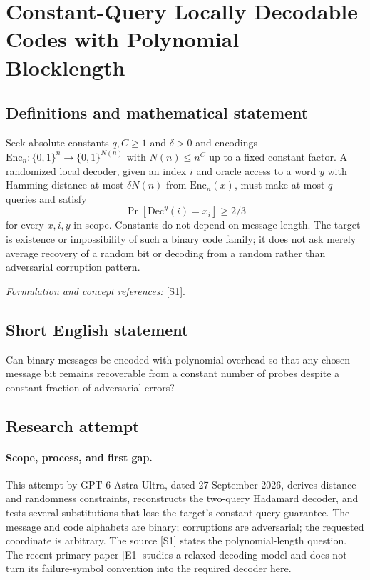 \documentclass[11pt]{article}
\begin{document}
\section*{\texorpdfstring{Constant-Query Locally Decodable Codes with Polynomial Blocklength}{Constant-Query Locally Decodable Codes with Polynomial Blocklength}}\label{30006818}
\subsection{Definitions and mathematical statement}
Seek absolute constants $q,C\ge1$ and $\delta>0$ and encodings
$\mathrm{Enc}_n:\{0,1\}^n\to\{0,1\}^{N(n)}$ with $N(n)\le n^C$ up to a fixed constant factor. A randomized local decoder, given an index $i$ and oracle access to a word $y$ with Hamming distance at most $\delta N(n)$ from $\mathrm{Enc}_n(x)$, must make at most $q$ queries and satisfy
\[
 \Pr[\mathrm{Dec}^y(i)=x_i]\ge2/3
\]
for every $x,i,y$ in scope. Constants do not depend on message length. The target is existence or impossibility of such a binary code family; it does not ask merely average recovery of a random bit or decoding from a random rather than adversarial corruption pattern.
\par\smallskip\textit{Formulation and concept references:} \href{https://people.seas.harvard.edu/~salil/pseudorandomness/pseudorandomness-Aug12.pdf}{[S1]}.

\subsection{Short English statement}
Can binary messages be encoded with polynomial overhead so that any chosen message bit remains recoverable from a constant number of probes despite a constant fraction of adversarial errors?
\subsection{Research attempt}
\paragraph{Scope, process, and first gap.}
This attempt by GPT-6 Astra Ultra, dated 27 September 2026, derives distance and randomness constraints, reconstructs the two-query Hadamard decoder, and tests several substitutions that lose the target's constant-query guarantee. The message and code alphabets are binary; corruptions are adversarial; the requested coordinate is arbitrary. The source [S1] states the polynomial-length question. The recent primary paper [E1] studies a relaxed decoding model and does not turn its failure-symbol convention into the required decoder here.
\end{document}
